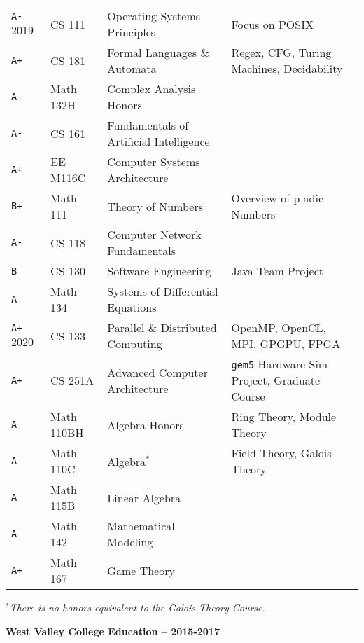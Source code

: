 \documentclass[11pt]{article}
\newcommand{\myTitle}[1]{{ \vspace{2mm} \large \color{titleColor} \hspace{-12mm} \textbf{\textsf{#1}} \vspace{2mm}}}
\newcommand{\lighttt}[1]{{\color{lightttColor}\texttt{#1}}}
\newcommand{\oddQuarter}[1]{{\color{oddTextColor}\hspace{-20mm} \textsf{#1}}}
\newcommand{\evenQuarter}[1]{{\hspace{-20mm} \textsf{#1}}}
\begin{document}
{\begin{tabular}{l l l l}
\rowcolor{oddColor}
\texttt{A-} \oddQuarter{2019} & CS 111 & Operating Systems Principles & Focus on POSIX \\
\rowcolor{oddColor}
\texttt{A+} & CS 181 & Formal Languages \& Automata & Regex, CFG, Turing Machines, Decidability \\
\rowcolor{oddColor}
\texttt{A-} & Math 132H & Complex Analysis Honors & \\

\rowcolor{evenColor}
\texttt{A-} & CS 161 & Fundamentals of Artificial Intelligence & \\
\rowcolor{evenColor}
\texttt{A+} & EE M116C & Computer Systems Architecture & \\
\rowcolor{evenColor}
\texttt{B+} & Math 111 & Theory of Numbers & Overview of p-adic Numbers \\

\rowcolor{oddColor}
\texttt{A-} & CS 118 & Computer Network Fundamentals & \\
\rowcolor{oddColor}
\texttt{B } & CS 130 & Software Engineering & Java Team Project \\
\rowcolor{oddColor}
\texttt{A } & Math 134 & Systems of Differential Equations & \\

\rowcolor{evenColor}
\texttt{A+} \evenQuarter{2020} & CS 133 & Parallel \& Distributed Computing & OpenMP, OpenCL, MPI, GPGPU, FPGA \\
\rowcolor{evenColor}
\texttt{A+} & CS 251A & Advanced Computer Architecture & \lighttt{gem5} Hardware Sim Project, Graduate Course \\
\rowcolor{evenColor}
\texttt{A } & Math 110BH & Algebra Honors & Ring Theory, Module Theory \\

\rowcolor{oddColor}
\texttt{A } & Math 110C & Algebra\( ^* \) & Field Theory, Galois Theory \\
\rowcolor{oddColor}
\texttt{A } & Math 115B & Linear Algebra & \\

\rowcolor{evenColor}
\texttt{A } & Math 142 & Mathematical Modeling & \\
\rowcolor{evenColor}
\texttt{A+} & Math 167 & Game Theory & \\
\hline
\end{tabular}
}

\textit{\( ^* \)There is no honors equivalent to the Galois Theory Course.}

\myTitle{West Valley College Education -- 2015-2017}
\end{document}

